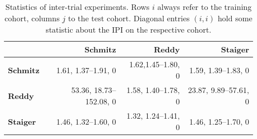 \begin{table}
    \vspace{0.5cm}
    \begin{subtable}{\textwidth}
        \centering
        \begin{tabular}{lrrr}
            \hline
            & \textbf{Schmitz} & \textbf{Reddy} & \textbf{Staiger} \\
            \hline
            \textbf{Schmitz} & \num{1.61}, \num{1.37}--\num{1.91}, \num{0} & 
                \num{1.62},\num{1.45}--\num{1.80}, \num{0} & 
                \num{1.59}, \num{1.39}--\num{1.83}, 0 \\
            \textbf{Reddy} & \num{53.36}, \num{18.73}--\num{152.08}, 0 & 
                \num{1.58}, \num{1.40}--\num{1.78}, \num{0} & 
                \num{23.87}, \num{9.89}--\num{57.61}, 0 \\
            \textbf{Staiger} & \num{1.46}, \num{1.32}--\num{1.60}, 0 & 
                \num{1.32}, \num{1.24}--\num{1.41}, \num{0} & 
                \num{1.46}, \num{1.25}--\num{1.70}, \num{0} \\
            \hline
        \end{tabular}
        \caption{Hazard ratio, its \num{95}\%-confidence interval and p-value for the null 
            hypothesis of the hazard ratio being equal to one. Diagonal entries $(i, i)$ show these 
            properties for the $\text{tIPI}$ on cohort $i$, off-diagonal entries show them 
            calculated on cohort $j$ for the best model trained and 
            validated on cohort $i$, $m_i^*$. All p-values are below 
            \num[scientific-notation]{5e-6} and hence rounded to $\num{0}$.}
            \label{subtab:inter-hr}
    \end{subtable}
    \caption{Statistics of inter-trial experiments. Rows $i$ always refer to the training cohort, 
        columns $j$ to the test cohort. Diagonal entries $(i, i)$ hold some statistic about the 
        IPI on the respective cohort.}
    \label{table:inter-trial}
\end{table}